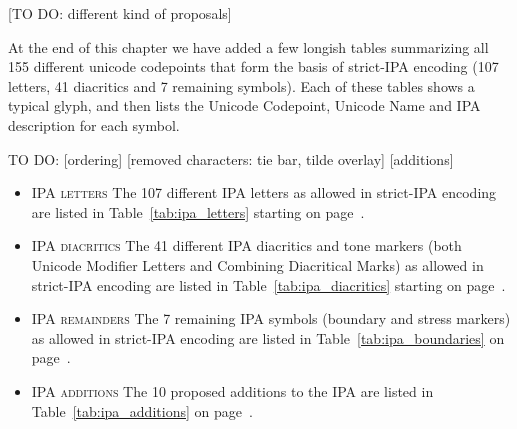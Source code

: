 [TO DO: different kind of proposals]

At the end of this chapter we have added a few longish tables summarizing all
155 different unicode codepoints that form the basis of strict-IPA encoding
(107 letters, 41 diacritics and 7 remaining symbols). Each of
these tables shows a typical glyph, and then lists the Unicode Codepoint,
Unicode Name and IPA description for each symbol.

TO DO:
[ordering]
[removed characters: tie bar, tilde overlay]
[additions]


\begin{itemize}[itemsep=6pt]

  \item \textsc{IPA letters} \newline
        The 107 different IPA letters as allowed in strict-IPA encoding are
        listed in Table~\ref{tab:ipa_letters} starting on
        page~\pageref{tab:ipa_letters}.
  \item \textsc{IPA diacritics} \newline The 41 different IPA diacritics and
        tone markers (both Unicode Modifier Letters and Combining Diacritical
        Marks) as allowed in strict-IPA encoding are listed in
        Table~\ref{tab:ipa_diacritics} starting on
        page~\pageref{tab:ipa_diacritics}.
  \item \textsc{IPA remainders} \newline
        The 7 remaining IPA symbols (boundary and stress markers) as allowed in
        strict-IPA encoding are listed in Table~\ref{tab:ipa_boundaries} on
        page~\pageref{tab:ipa_boundaries}. 
  \item \textsc{IPA additions} \newline
        The 10 proposed additions to the IPA are listed in
        Table~\ref{tab:ipa_additions} on page~\pageref{tab:ipa_additions}.
  
\end{itemize}


\newpage

 


